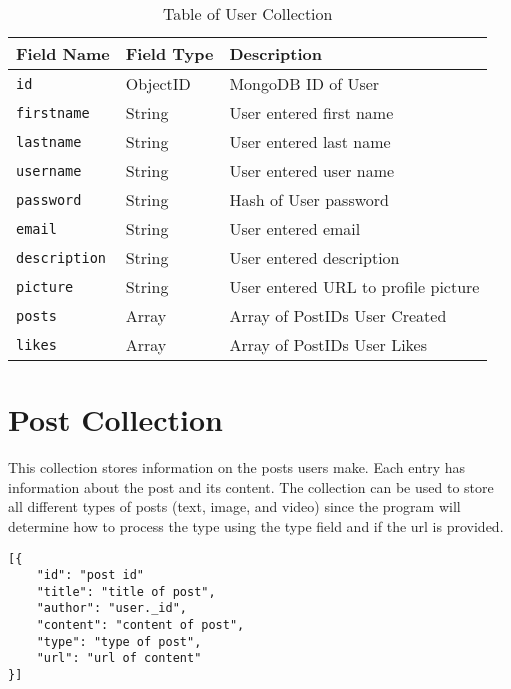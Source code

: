 \documentclass{homework}
\begin{document}
\begin{table}[H]
    \centering
    \begin{tabular}{lll}
        \hline
        Field Name  & Field Type & Description                         \\ \hline
        \texttt{id}          & ObjectID   & MongoDB ID of User                  \\
        \texttt{firstname}   & String     & User entered first name             \\
        \texttt{lastname}    & String     & User entered last name              \\
        \texttt{username}    & String     & User entered user name              \\
        \texttt{password}    & String     & Hash of User password               \\
        \texttt{email}       & String     & User entered email                  \\
        \texttt{description} & String     & User entered description            \\
        \texttt{picture}     & String     & User entered URL to profile picture \\
        \texttt{posts}       & Array      & Array of PostIDs User Created       \\
        \texttt{likes}       & Array      & Array of PostIDs User Likes        \\
        \hline
    \end{tabular}
    \caption{Table of User Collection}
\end{table}

\newpage
\section{Post Collection}

This collection stores information on the posts users make. Each entry has information about the post and its content. The collection can be used to store all different types of posts (text, image, and video) since the program will determine how to process the type using the type field and if the url is provided. \\

\begin{lstlisting}[caption={JSON for Post Collection}, captionpos=b]
[{
    "id": "post id"
    "title": "title of post",
    "author": "user._id",
    "content": "content of post",
    "type": "type of post",
    "url": "url of content"
}]
\end{lstlisting}
\end{document}
